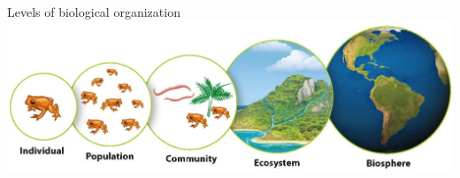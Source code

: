 \documentclass[12pt]{beamer}
\begin{document}

\begin{frame}

	\begin{flushright}
	  \Large \textcolor{boss2}{ } 
	\end{flushright}
\end{frame}


\begin{frame}

	\begin{flushright}
	  \Large \textcolor{boss2}{ } 
	\end{flushright}
\end{frame}



\begin{frame}

	\begin{flushright}
	  \Large \textcolor{boss2}{ } 
	\end{flushright}
\end{frame}



\begin{frame}

	\begin{flushright}
	  \Large \textcolor{boss2}{ } 
	\end{flushright}
\end{frame}




















\begin{frame}

  \textcolor{boss5}{Levels of biological organization}\\
  \includegraphics[width=\textwidth]{figs/ecologicalOrganization.png}
\end{frame}
\end{document}
